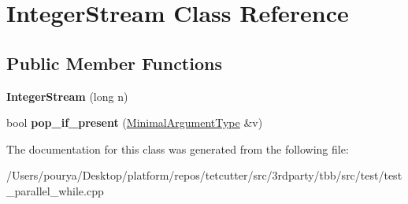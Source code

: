 \hypertarget{classIntegerStream}{}\section{Integer\+Stream Class Reference}
\label{classIntegerStream}
\subsection*{Public Member Functions}
\begin{DoxyCompactItemize}
\item 
\hypertarget{classIntegerStream_ac63403fad3233f434530aace086debc6}{}{\bfseries Integer\+Stream} (long n)\label{classIntegerStream_ac63403fad3233f434530aace086debc6}

\item 
\hypertarget{classIntegerStream_a057f05cf772a02f205688d5a87005b29}{}bool {\bfseries pop\+\_\+if\+\_\+present} (\hyperlink{classMinimalArgumentType}{Minimal\+Argument\+Type} \&v)\label{classIntegerStream_a057f05cf772a02f205688d5a87005b29}

\end{DoxyCompactItemize}


The documentation for this class was generated from the following file\+:\begin{DoxyCompactItemize}
\item 
/\+Users/pourya/\+Desktop/platform/repos/tetcutter/src/3rdparty/tbb/src/test/test\+\_\+parallel\+\_\+while.\+cpp\end{DoxyCompactItemize}
